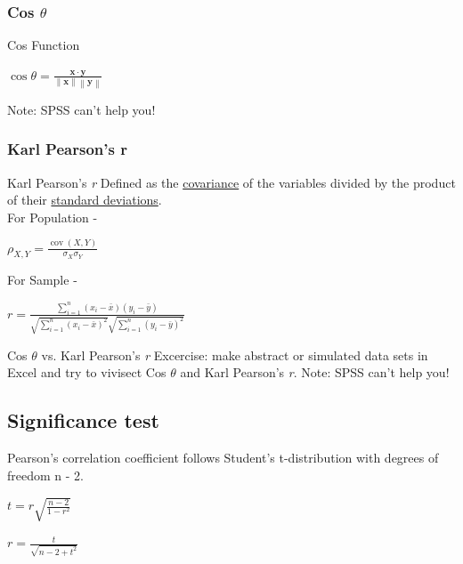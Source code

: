 \documentclass{beamer}
\begin{document}
\subsubsection{Cos $\theta$}

\begin{frame}{Cos Function}
	\begin{center}
$\cos \theta ={\frac {\mathbf {x} \cdot \mathbf {y} }{\left\|\mathbf {x} \right\|\left\|\mathbf {y} \right\|}}$
	\end{center}
	\vfill 
	Note: SPSS can't help you!
\end{frame}

\subsubsection{Karl Pearson's r}

\begin{frame}{Karl Pearson's \emph{r}}
	Defined as the \underline{covariance} of the variables divided by the product of their \underline{standard deviations}. \\ \vspace{1cm}
	For Population - 
	\begin{center}
	$ \rho _{X,Y}={\frac {\operatorname {cov} (X,Y)}{\sigma _{X}\sigma _{Y}}} $	
	\end{center}
	
		\vspace{1cm}
	For Sample - 
	
\begin{center}
$r={\frac {\sum _{i=1}^{n}(x_{i}-{\bar {x}})(y_{i}-{\bar {y}})}{{\sqrt {\sum _{i=1}^{n}(x_{i}-{\bar {x}})^{2}}}{\sqrt {\sum _{i=1}^{n}(y_{i}-{\bar {y}})^{2}}}}}$
	
\end{center}
\end{frame}

\begin{frame}{Cos $\theta$ vs. Karl Pearson's \emph{r}}
	Excercise: make abstract or simulated data sets in Excel and try to vivisect Cos $\theta$ and Karl Pearson's \emph{r}. 
	\vfill
Note: SPSS can't help you!
\end{frame}

\subsection{Significance test}

\begin{frame}
	Pearson's correlation coefficient follows Student's t-distribution with degrees of freedom n - 2.
	
	\begin{center}
		
$t=r{\sqrt {\frac {n-2}{1-r^{2}}}} $

$r={\frac {t}{\sqrt {n-2+t^{2}}}}$
	\end{center}
\end{frame}
\end{document}
